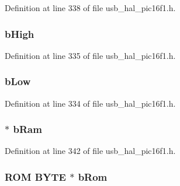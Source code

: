 Definition at line 338 of file usb\+\_\+hal\+\_\+pic16f1.\+h.

\hypertarget{union___p_o_i_n_t_e_r_a8e2d6813fd08f41226f10f65c05ffe7b}{}
\subsubsection[{b\+High}]{ b\+High}\label{union___p_o_i_n_t_e_r_a8e2d6813fd08f41226f10f65c05ffe7b}


Definition at line 335 of file usb\+\_\+hal\+\_\+pic16f1.\+h.

\hypertarget{union___p_o_i_n_t_e_r_a072a7dd91588708091200278cf02b094}{}
\subsubsection[{b\+Low}]{ b\+Low}\label{union___p_o_i_n_t_e_r_a072a7dd91588708091200278cf02b094}


Definition at line 334 of file usb\+\_\+hal\+\_\+pic16f1.\+h.

\hypertarget{union___p_o_i_n_t_e_r_ae2ae207314ea88e2dec151249e668c86}{}
\subsubsection[{b\+Ram}]{ $\ast$ b\+Ram}\label{union___p_o_i_n_t_e_r_ae2ae207314ea88e2dec151249e668c86}


Definition at line 342 of file usb\+\_\+hal\+\_\+pic16f1.\+h.

\hypertarget{union___p_o_i_n_t_e_r_a2d27605a798ca63fe52222945ce5261a}{}
\subsubsection[{b\+Rom}]{\setlength{\rightskip}{0pt plus 5cm}R\+O\+M {\bf B\+Y\+T\+E} $\ast$ b\+Rom}\label{union___p_o_i_n_t_e_r_a2d27605a798ca63fe52222945ce5261a}


